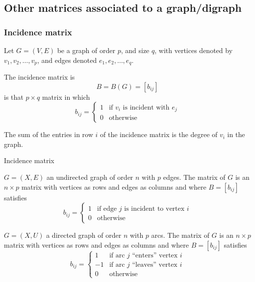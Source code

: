 \documentclass[aspectratio=43]{beamer}
\begin{document}
\subsection{Other matrices associated to a graph/digraph}

\begin{frame}\frametitle{Incidence matrix}
	Let $G=(V,E)$ be a graph of order $p$, and size $q$, with vertices denoted by $v_1, v_2, \dots , v_p$, and edges denoted $e_1, e_2, \dots , e_q$.
	\begin{definition}
		The incidence matrix is $$B=B(G)=[b_{ij}]$$ is that $p\times q$ matrix in which
		$$b_{ij}=\left \{ 
		\begin{array}{cc}
			1 & \textrm{if } v_i \textrm{ is incident with } e_j\\
			0 & \textrm{otherwise}
		\end{array}
		\right .
		$$
	\end{definition}
	\begin{theorem}
		The sum of the entries in row $i$ of the incidence matrix is the degree of $v_i$ in the graph.
	\end{theorem}
\end{frame}

\begin{frame}{Incidence matrix}
	\begin{definition}
		$G=(X,E)$ an undirected graph of order $n$ with $p$ edges. The  matrix of $G$ is an $n\times p$ matrix with vertices as rows and edges as columns and where $B=[b_{ij}]$ satisfies
		\[
		b_{ij} = \begin{cases}
			1 & \text{if edge }j\text{ is incident to vertex }i \\
			0 & \text{otherwise}
		\end{cases}
		\]
	\end{definition}
	\vfill
	\begin{definition}
		$G=(X,U)$ a directed graph of order $n$ with $p$ arcs. The  matrix of $G$ is an $n\times p$ matrix with vertices as rows and edges as columns and where $B=[b_{ij}]$ satisfies
		\[
		b_{ij} = \begin{cases}
			1 & \text{if arc }j\text{ ``enters'' vertex }i \\
			-1 & \text{if arc }j\text{ ``leaves'' vertex }i \\
			0 & \text{otherwise}
		\end{cases}
		\]
	\end{definition}
\end{frame}
\end{document}

